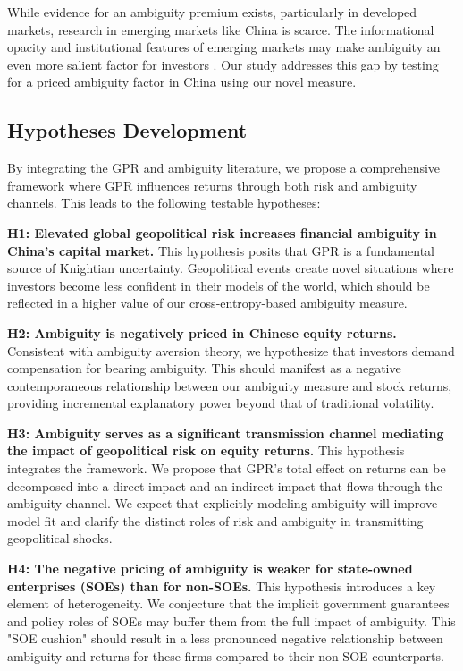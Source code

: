 \documentclass[preprint,12pt,authoryear]{elsarticle}
\begin{document}
While evidence for an ambiguity premium exists, particularly in developed markets, research in emerging markets like China is scarce. The informational opacity and institutional features of emerging markets may make ambiguity an even more salient factor for investors \citep{Easley2009}. Our study addresses this gap by testing for a priced ambiguity factor in China using our novel measure.

\subsection{Hypotheses Development}

By integrating the GPR and ambiguity literature, we propose a comprehensive framework where GPR influences returns through both risk and ambiguity channels. This leads to the following testable hypotheses:

\textbf{H1: Elevated global geopolitical risk increases financial ambiguity in China's capital market.}
This hypothesis posits that GPR is a fundamental source of Knightian uncertainty. Geopolitical events create novel situations where investors become less confident in their models of the world, which should be reflected in a higher value of our cross-entropy-based ambiguity measure.

\textbf{H2: Ambiguity is negatively priced in Chinese equity returns.}
Consistent with ambiguity aversion theory, we hypothesize that investors demand compensation for bearing ambiguity. This should manifest as a negative contemporaneous relationship between our ambiguity measure and stock returns, providing incremental explanatory power beyond that of traditional volatility.

\textbf{H3: Ambiguity serves as a significant transmission channel mediating the impact of geopolitical risk on equity returns.}
This hypothesis integrates the framework. We propose that GPR's total effect on returns can be decomposed into a direct impact and an indirect impact that flows through the ambiguity channel. We expect that explicitly modeling ambiguity will improve model fit and clarify the distinct roles of risk and ambiguity in transmitting geopolitical shocks.

\textbf{H4: The negative pricing of ambiguity is weaker for state-owned enterprises (SOEs) than for non-SOEs.}
This hypothesis introduces a key element of heterogeneity. We conjecture that the implicit government guarantees and policy roles of SOEs may buffer them from the full impact of ambiguity. This "SOE cushion" should result in a less pronounced negative relationship between ambiguity and returns for these firms compared to their non-SOE counterparts.
\end{document}
